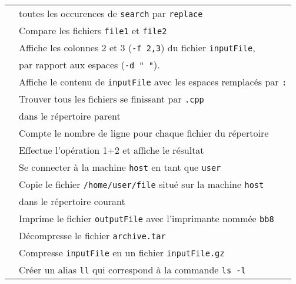 \documentclass [a4paper]{article}
\begin{document}
\begin{tabular}{ ll }
                                                          & toutes les occurences de \verb+search+ par \verb+replace+\\
\hspace{0.5cm}{\verb+diff file1 file2+}                   & Compare les fichiers \verb+file1+ et \verb+file2+\\
\hspace{0.5cm}{\verb+cut -d " " -f 2,3 inputFile+}        & Affiche les colonnes 2 et 3 (\verb+-f 2,3+) du fichier \verb+inputFile+, \\
                                                          & par rapport aux espaces (\verb+-d " "+). \\
\hspace{0.5cm}{\verb+cat inputFile | tr " " ":"+}         & Affiche le contenu de \verb+inputFile+ avec les espaces remplacés par \verb+:+\\
\hspace{0.5cm}{\verb+find ../ -name "*.cpp"+}             & Trouver tous les fichiers se finissant par \verb+.cpp+\\
                                                          & dans le répertoire parent\\
\hspace{0.5cm}{\verb+wc -l *+}                            & Compte le nombre de ligne pour chaque fichier du répertoire\\
\hspace{0.5cm}{\verb?bc <<< "1+2"?}                       & Effectue l'opération 1+2 et affiche le résultat\\
\hspace{0.5cm}{\verb?ssh user@host?}                      & Se connecter à la machine \verb+host+ en tant que \verb+user+\\
\hspace{0.5cm}{\verb?scp user@host:/home/user/file ./?}   & Copie le fichier \verb+/home/user/file+ situé sur la machine \verb+host+ \\
                                                          & dans le répertoire courant \\
\hspace{0.5cm}{\verb?lpr -Pbb8 outputFile?}               & Imprime le fichier \verb+outputFile+ avec l'imprimante nommée \verb+bb8+\\
\hspace{0.5cm}{\verb?tar -xvf archive.tar?}               & Décompresse le fichier \verb+archive.tar+\\
\hspace{0.5cm}{\verb?gzip inputFile?}                     & Compresse \verb+inputFile+ en un fichier \verb+inputFile.gz+\\
\hspace{0.5cm}{\verb?alias ll='ls -l'?}                   & Créer un alias \verb+ll+ qui correspond à la commande \verb+ls -l+\\

\hline
\end{tabular}
\end{document}
